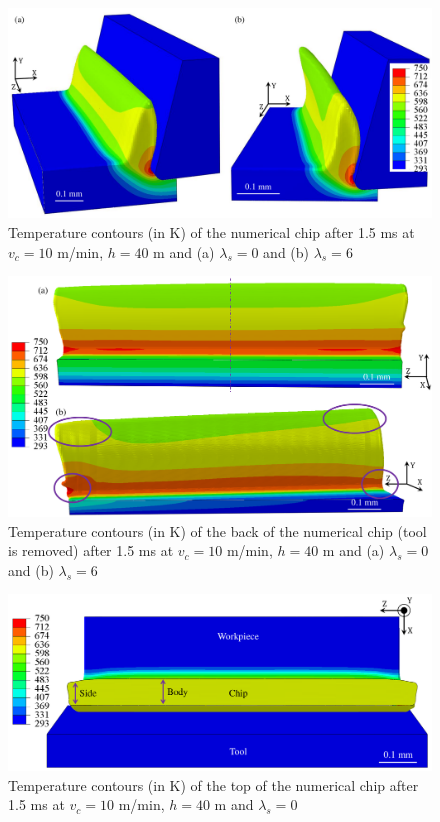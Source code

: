 \documentclass[preprint,12pt,times]{elsarticle}
\begin{document}
\begin{figure}[!h]
\centering
\includegraphics[width = 140 mm]{Figures/ChipsNum}
\caption{Temperature contours (in K) of the numerical chip after 1.5 ms at $v_c = 10$ m/min, $h = 40$ \textmu{}m and (a) $\lambda_s = 0$\textdegree{} and (b) $\lambda_s = 6$\textdegree{}}
\label{ChipsNum}
\end{figure}

\begin{figure}[!h]
\centering
\includegraphics[width = 140 mm]{Figures/ChipsNumBack}
\caption{Temperature contours (in K) of the back of the numerical chip (tool is removed) after 1.5 ms at $v_c = 10$ m/min, $h = 40$ \textmu{}m and (a) $\lambda_s = 0$\textdegree{} and (b) $\lambda_s = 6$\textdegree{}}
\label{ChipsNumBack}
\end{figure}

\begin{figure}[!h]
\centering
\includegraphics[width = 140 mm]{Figures/ChipNumTop}
\caption{Temperature contours (in K) of the top of the numerical chip after 1.5 ms at $v_c = 10$ m/min, $h = 40$ \textmu{}m and $\lambda_s = 0$\textdegree{}}
\label{ChipNumTop}
\end{figure}
\end{document}
